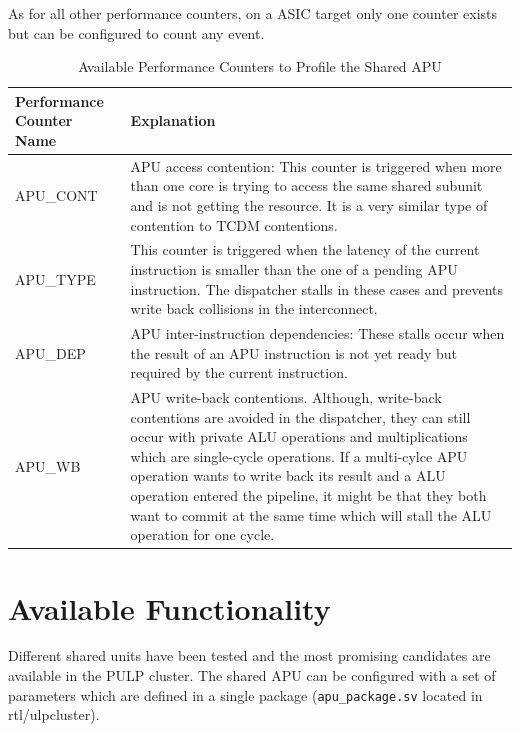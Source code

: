 \documentclass[%
 oneside,      %
 openany,      %
 halfparskip,  %
]{scrbook}
\begin{document}
As for all other performance counters, on a ASIC target only one counter exists but can be configured to count any event.

\begin{table}[t]\footnotesize
\begin{threeparttable}
\renewcommand\arraystretch{0.5}
\caption{Available Performance Counters to Profile the Shared APU}
\centering
\label{tab_perf_counters}
\begin{tabularx}{\textwidth}{@{}l|p{10cm}@{}}
\toprule
\textbf{Performance Counter Name} & \textbf{Explanation}\\
\midrule
APU\_CONT   & APU access contention: This counter is triggered when more than one core is trying to access the same shared subunit and is not getting the resource. It is a very similar type of contention to TCDM contentions.\\
\midrule
APU\_TYPE   & This counter is triggered when the latency of the current instruction is smaller than the one of a pending APU instruction. The dispatcher stalls in these cases and prevents write back collisions in the interconnect.\\
\midrule
APU\_DEP    & APU inter-instruction dependencies: These stalls occur when the result of an APU instruction is not yet ready but required by the current instruction.\\
\midrule
APU\_WB     & APU write-back contentions. Although, write-back contentions are avoided in the dispatcher, they can still occur with private ALU operations and multiplications which are single-cycle operations. If a multi-cylce APU operation wants to write back its result and a ALU operation entered the pipeline, it might be that they both want to commit at the same time which will stall the ALU operation for one cycle.\\
\bottomrule
\end{tabularx}
\end{threeparttable}
\end{table}

\chapter{Available Functionality}\label{ch:examples}

Different shared units have been tested and the most promising candidates are available in the PULP cluster. The shared APU can be configured with a set of parameters which are defined in a single package (\texttt{apu\_package.sv} located in rtl/ulpcluster).
\end{document}
